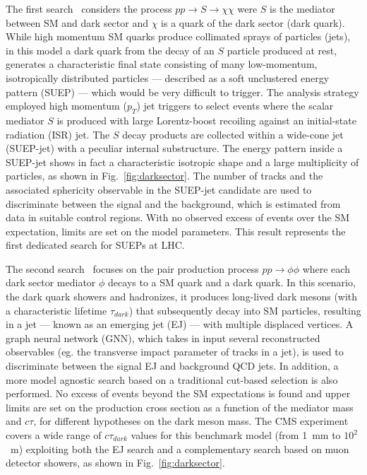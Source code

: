 \documentclass{moriond}
\begin{document}
The first search~\cite{CMS:2024nca} considers the process $pp \rightarrow S \rightarrow \chi
\chi$ were $S$ is the mediator between SM and dark sector and $\chi$
is a quark of the dark sector (dark quark). While high momentum SM quarks
produce collimated sprays of particles (jets), in this model a dark
quark from the decay of an $S$ particle produced at rest, generates a characteristic final state consisting of many
low-momentum, isotropically distributed particles —  described
as a soft unclustered energy pattern (SUEP) — which would be very
difficult to trigger. The analysis strategy employed high momentum ($p_T$) jet triggers to
select events where the scalar mediator $S$ is produced with large
Lorentz-boost recoiling against an initial-state radiation (ISR)
jet. The $S$ decay products are collected within a wide-cone jet (SUEP-jet) with
a peculiar internal substructure. The energy pattern inside a SUEP-jet shows in fact
a characteristic isotropic shape and a large multiplicity of particles, as shown in Fig.~\ref{fig:darksector}. The number of tracks and the associated sphericity
observable in the SUEP-jet candidate are used to discriminate between the signal and the
background, which is estimated from data in suitable control regions.
With no observed excess of events over the SM expectation,
limits are set on the model parameters. This result represents the first dedicated
search for SUEPs at LHC.

The second search~\cite{CMS:2024gxp} focuses on the pair production
process $pp \rightarrow \phi\phi$ where each dark sector mediator $\phi$ decays to a SM
quark and a dark quark. In this scenario, the dark quark showers and
hadronizes, it produces long-lived dark mesons (with a characteristic
lifetime $\tau_{dark}$) that subsequently decay into SM particles, resulting in a jet
— known as an emerging jet (EJ) — with multiple displaced
vertices. A graph neural network (GNN), which takes in input several reconstructed
observables (eg. the transverse impact parameter of tracks in a jet), is used to discriminate between the
signal EJ and background QCD jets. In addition, a more model
agnostic search based on a traditional cut-based selection is also
performed. No excess of events beyond the SM expectations is found and
upper limits are set on the production cross section as a function of the mediator mass and $c\tau$, for different
hypotheses on the dark meson mass. The CMS experiment covers a wide
range of $c\tau_{dark}$ values for this benchmark model (from 1~mm to
$10^2$~m) exploiting both the EJ search and a complementary search
based on muon detector showers, as shown in Fig.~\ref{fig:darksector}.
\end{document}
